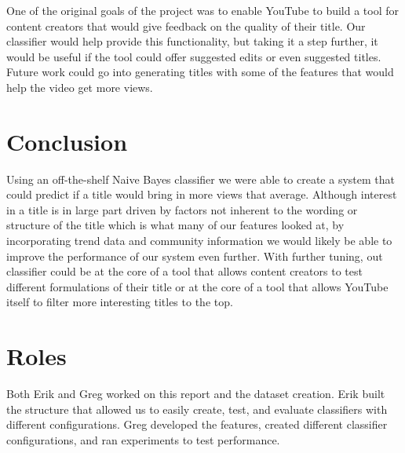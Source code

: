 \documentclass[a4paper,12pt]{article}
\begin{document}
One of the original goals of the project was to enable YouTube to build a tool for content creators that would give feedback on the quality of their title. Our classifier would help provide this functionality, but taking it a step further, it would be useful if the tool could offer suggested edits or even suggested titles. Future work could go into generating titles with some of the features that would help the video get more views.

\section{Conclusion}

Using an off-the-shelf Naive Bayes classifier we were able to create a system that could predict if a title would bring in more views that average. Although interest in a title is in large part driven by factors not inherent to the wording or structure of the title which is what many of our features looked at, by incorporating trend data and community information we would likely be able to improve the performance of our system even further. With further tuning, out classifier could be at the core of a tool that allows content creators to test different formulations of their title or at the core of a tool that allows YouTube itself to filter more interesting titles to the top.





\appendix
\section{Roles}
Both Erik and Greg worked on this report and the dataset creation. Erik built the structure that allowed us to easily create, test, and evaluate classifiers with different configurations. Greg developed the features, created different classifier configurations, and ran experiments to test performance.
\end{document}
